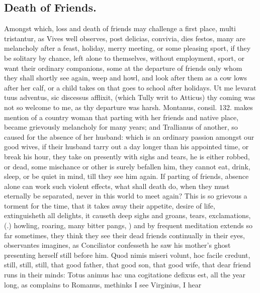 {\subsection{Death of Friends.}
Amongst which, loss and death of friends may
challenge a first place, multi tristantur, as Vives well
observes, post delicias, convivia, dies festos, many are melancholy
after a feast, holiday, merry meeting, or some pleasing sport, if they
be solitary by chance, left alone to themselves, without employment,
sport, or want their ordinary companions, some at the departure of
friends only whom they shall shortly see again, weep and howl, and look
after them as a cow lows after her calf, or a child takes on that goes
to school after holidays. Ut me levarat tuus adventus, sic discessus
afflixit, (which Tully writ to Atticus) thy coming was not so
welcome to me, as thy departure was harsh. Montanus, consil. 132. makes
mention of a country woman that parting with her friends and native
place, became grievously melancholy for many years; and Trallianus of
another, so caused for the absence of her husband: which is an ordinary
passion amongst our good wives, if their husband tarry out a day longer
than his appointed time, or break his hour, they take on presently with
sighs and tears, he is either robbed, or dead, some mischance or other
is surely befallen him, they cannot eat, drink, sleep, or be quiet in
mind, till they see him again. If parting of friends, absence alone can
work such violent effects, what shall death do, when they must
eternally be separated, never in this world to meet again? This is so
grievous a torment for the time, that it takes away their appetite,
desire of life, extinguisheth all delights, it causeth deep sighs and
groans, tears, exclamations,
(.) 
howling, roaring, many bitter pangs, ) and by frequent meditation extends so
far sometimes, they think they see their dead friends continually
in their eyes, observantes imagines, as Conciliator confesseth he saw
his mother's ghost presenting herself still before him. Quod nimis
miseri volunt, hoc facile credunt, still, still, still, that good
father, that good son, that good wife, that dear friend runs in their
minds: Totus animus hac una cogitatione defixus est, all the year long,
as \Pliny{} complains to Romanus, methinks I see Virginius, I hear
}
